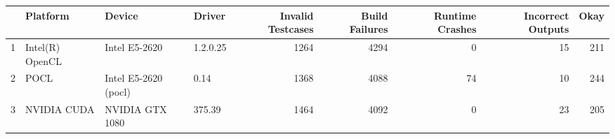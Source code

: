 \begin{tabular}{llllrrrrr}
\toprule
{} &         Platform &                Device &    Driver &  Invalid Testcases &  Build Failures &  Runtime Crashes &  Incorrect Outputs &  Okay \\
\midrule
1 &  Intel(R) OpenCL &         Intel E5-2620 &  1.2.0.25 &               1264 &            4294 &                0 &                 15 &   211 \\
2 &             POCL &  Intel E5-2620 (pocl) &      0.14 &               1368 &            4088 &               74 &                 10 &   244 \\
3 &      NVIDIA CUDA &       NVIDIA GTX 1080 &    375.39 &               1464 &            4092 &                0 &                 23 &   205 \\
\bottomrule
\end{tabular}
